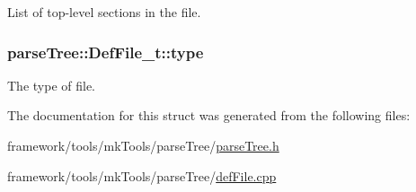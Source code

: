 List of top-\/level sections in the file. 

\subsubsection[{\texorpdfstring{type}{type}}]{ parse\+Tree\+::\+Def\+File\+\_\+t\+::type}\hypertarget{structparse_tree_1_1_def_file__t_abb3379281edf9791898e2bd4e0102a92}{}\label{structparse_tree_1_1_def_file__t_abb3379281edf9791898e2bd4e0102a92}


The type of file. 



The documentation for this struct was generated from the following files\+:\begin{DoxyCompactItemize}
\item 
framework/tools/mk\+Tools/parse\+Tree/\hyperlink{parse_tree_8h}{parse\+Tree.\+h}\item 
framework/tools/mk\+Tools/parse\+Tree/\hyperlink{def_file_8cpp}{def\+File.\+cpp}\end{DoxyCompactItemize}
